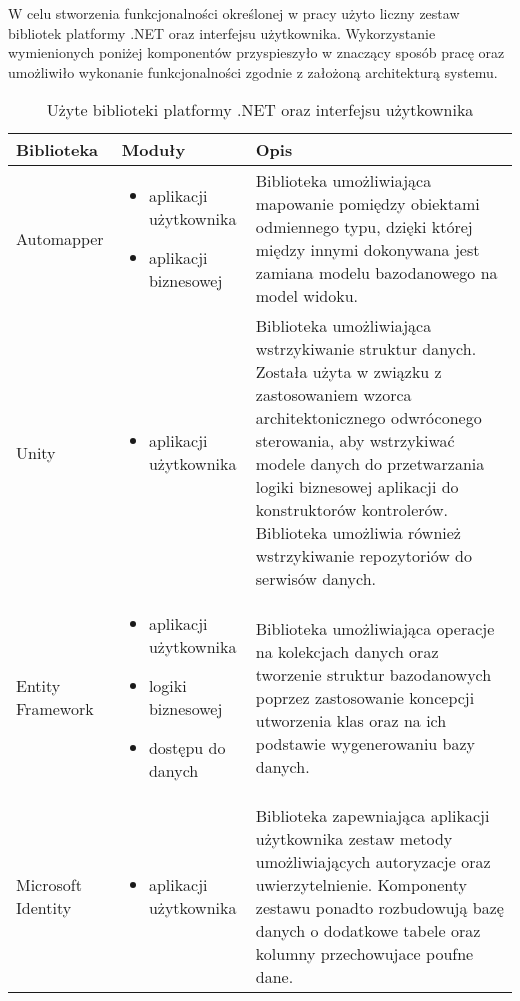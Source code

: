 W celu stworzenia funkcjonalności określonej w pracy użyto liczny zestaw bibliotek platformy .NET oraz interfejsu użytkownika. Wykorzystanie wymienionych poniżej komponentów przyspieszyło w znaczący sposób pracę oraz umożliwiło wykonanie funkcjonalności zgodnie z założoną architekturą systemu.

\begin{center}
    \begin{longtable}{ | p{2.2cm} | p{5cm} | p{6.5cm} |}
   	\caption{Użyte biblioteki platformy .NET oraz interfejsu użytkownika} \\
    \hline Biblioteka & Moduły & Opis \\ \hline    
    \hline Automapper &  
    	\begin{itemize} 
   			 \item aplikacji użytkownika
   			 \item aplikacji biznesowej	
   		\end{itemize} 
    & Biblioteka umożliwiająca mapowanie pomiędzy obiektami odmiennego typu, dzięki której między innymi dokonywana jest zamiana modelu bazodanowego na model widoku.\\ \hline
    
    \hline Unity &	
    \begin{itemize} 
   			 \item aplikacji użytkownika
    \end{itemize}
   			 & Biblioteka umożliwiająca wstrzykiwanie struktur danych. Została użyta w związku z zastosowaniem wzorca architektonicznego odwróconego sterowania, aby wstrzykiwać modele danych do przetwarzania logiki biznesowej aplikacji do konstruktorów kontrolerów. Biblioteka umożliwia również wstrzykiwanie repozytoriów do serwisów danych.	\\ \hline
    
        \hline Entity \mbox{Framework} &  
    	\begin{itemize} 
   			  \item aplikacji użytkownika
 			  \item logiki biznesowej
			  \item dostępu do danych
   		\end{itemize} 
    &  Biblioteka umożliwiająca operacje na kolekcjach danych oraz tworzenie struktur bazodanowych poprzez zastosowanie koncepcji utworzenia klas oraz na ich podstawie wygenerowaniu bazy danych.\\ \hline
    
        \hline Microsoft Identity & 
         \begin{itemize} 
   			 \item aplikacji użytkownika
    	\end{itemize} & Biblioteka zapewniająca aplikacji użytkownika zestaw metody umożliwiających autoryzacje oraz uwierzytelnienie. Komponenty zestawu ponadto rozbudowują bazę danych o dodatkowe tabele oraz kolumny przechowujace poufne dane. \\ \hline
    

\end{longtable}
\end{center}
